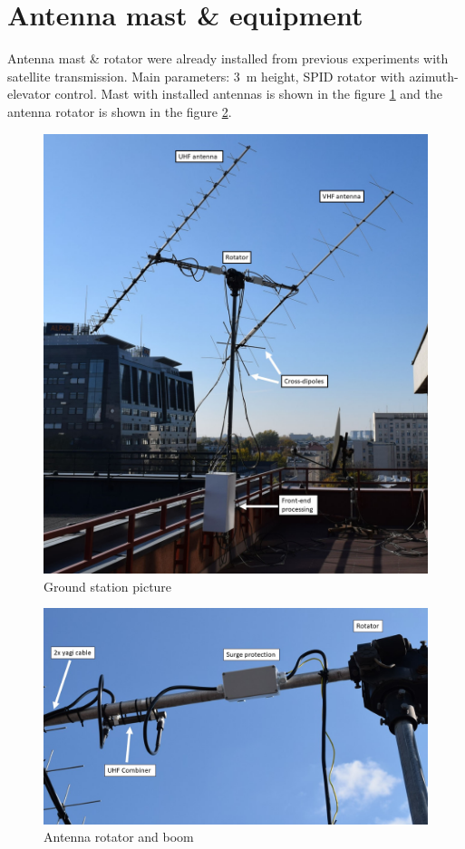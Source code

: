 \section{Antenna mast \& equipment}
Antenna mast \& rotator were already installed from previous experiments with satellite transmission. Main parameters: \SI{3}{\meter} height, SPID rotator with azimuth-elevator control. Mast with installed antennas is shown in the figure \ref{elka_antena_mast} and the antenna rotator is shown in the figure \ref{elka_antenna_rotator}.

\begin{figure}
    \centering
    \includegraphics[width=0.5\paperwidth]{img/7/elka_antena_mast.jpg}
    \caption{Ground station picture}
    \label{elka_antena_mast}
\end{figure}

\begin{figure}
    \centering
    \includegraphics[width=0.75\paperwidth]{img/7/elka_antenna_rotator.jpg}
    \caption{Antenna rotator and boom}
    \label{elka_antenna_rotator}
\end{figure}

